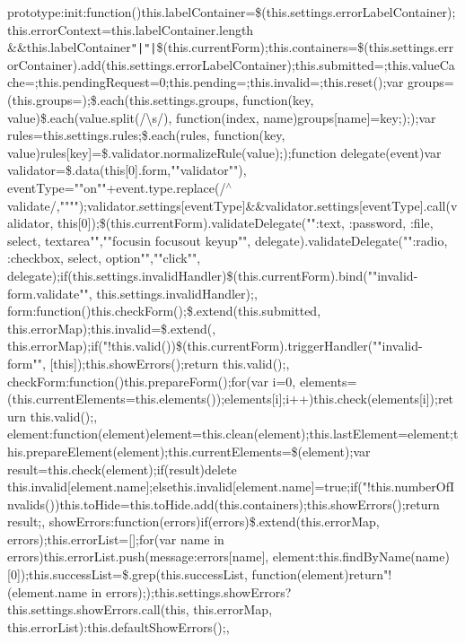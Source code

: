 prototype\+:\lcurly{}init\+:function()\lcurly{}this.\+label\+Container=\$(this.\+settings.\+error\+Label\+Container);this.\+error\+Context=this.\+label\+Container.\+length \&\&this.\+label\+Container\texttt{"|}\texttt{"|}\$(this.\+current\+Form);this.\+containers=\$(this.\+settings.\+error\+Container).\+add(this.\+settings.\+error\+Label\+Container);this.\+submitted=\lcurly{}\rcurly{};this.\+value\+Cache=\lcurly{}\rcurly{};this.\+pending\+Request=0;this.\+pending=\lcurly{}\rcurly{};this.\+invalid=\lcurly{}\rcurly{};this.\+reset();var groups=(this.\+groups=\lcurly{}\rcurly{});\$.\+each(this.\+settings.\+groups, function(key, value)\lcurly{}\$.\+each(value.\+split(/\textbackslash{}s/), function(index, name)\lcurly{}groups[name]=key;\rcurly{});\rcurly{});var rules=this.\+settings.\+rules;\$.\+each(rules, function(key, value)\lcurly{}rules[key]=\$.\+validator.\+normalize\+Rule(value);\rcurly{});function delegate(event)\lcurly{}var validator=\$.\+data(this[0].\+form,""validator""), event\+Type=""on""+event.\+type.\+replace(/$^\wedge$validate/,"""");validator.\+settings[event\+Type]\&\&validator.\+settings[event\+Type].\+call(validator, this[0]);\rcurly{}\$(this.\+current\+Form).\+validate\+Delegate(""\+:text, \+:password, \+:file, select, textarea"",""focusin focusout keyup"", delegate).\+validate\+Delegate(""\+:radio, \+:checkbox, select, option"",""click"", delegate);if(this.\+settings.\+invalid\+Handler)\$(this.\+current\+Form).\+bind(""invalid-\/form.\+validate"", this.\+settings.\+invalid\+Handler);\rcurly{}, form\+:function()\lcurly{}this.\+check\+Form();\$.\+extend(this.\+submitted, this.\+error\+Map);this.\+invalid=\$.\+extend(\lcurly{}\rcurly{}, this.\+error\+Map);if("!this.\+valid())\$(this.\+current\+Form).\+trigger\+Handler(""invalid-\/form"", [this]);this.\+show\+Errors();return this.\+valid();\rcurly{}, check\+Form\+:function()\lcurly{}this.\+prepare\+Form();for(var i=0, elements=(this.\+current\+Elements=this.\+elements());elements[i];i++)\lcurly{}this.\+check(elements[i]);\rcurly{}return this.\+valid();\rcurly{}, element\+:function(element)\lcurly{}element=this.\+clean(element);this.\+last\+Element=element;this.\+prepare\+Element(element);this.\+current\+Elements=\$(element);var result=this.\+check(element);if(result)\lcurly{}delete this.\+invalid[element.\+name];\rcurly{}else\lcurly{}this.\+invalid[element.\+name]=true;\rcurly{}if("!this.\+number\+Of\+Invalids())\lcurly{}this.\+to\+Hide=this.\+to\+Hide.\+add(this.\+containers);\rcurly{}this.\+show\+Errors();return result;\rcurly{}, show\+Errors\+:function(errors)\lcurly{}if(errors)\lcurly{}\$.\+extend(this.\+error\+Map, errors);this.\+error\+List=[];for(var name in errors)\lcurly{}this.\+error\+List.\+push(\lcurly{}message\+:errors[name], element\+:this.\+find\+By\+Name(name)[0]\rcurly{});\rcurly{}this.\+success\+List=\$.\+grep(this.\+success\+List, function(element)\lcurly{}return"!(element.\+name in errors);\rcurly{});\rcurly{}this.\+settings.\+show\+Errors?this.\+settings.\+show\+Errors.\+call(this, this.\+error\+Map, this.\+error\+List)\+:this.\+default\+Show\+Errors();\rcurly{}, 